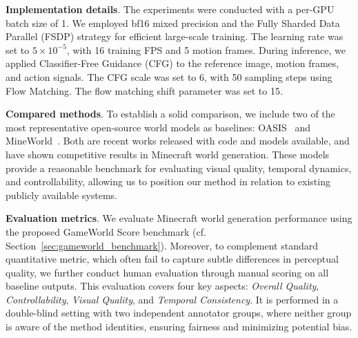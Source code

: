 \documentclass{article}
\begin{document}
\textbf{Implementation details}. 
The experiments were conducted with a per-GPU batch size of 1. We employed bf16 mixed precision and the Fully Sharded Data Parallel (FSDP) strategy for efficient large-scale training. The learning rate was set to $5 \times 10^{-5}$, with 16 training FPS and 5 motion frames. During inference, we applied Classifier-Free Guidance (CFG) to the reference image, motion frames, and action signals. The CFG scale was set to 6, with 50 sampling steps using Flow Matching. The flow matching shift parameter was set to 15.



\textbf{Compared methods}. 
To establish a solid comparison, we include two of the most representative open-source world models as baselines: OASIS~\cite{oasis2024} and MineWorld~\cite{guo2025mineworld}. Both are recent works released with code and models available, and have shown competitive results in Minecraft world generation. These models provide a reasonable benchmark for evaluating visual quality, temporal dynamics, and controllability, allowing us to position our method in relation to existing publicly available systems.


\textbf{Evaluation metrics}. We evaluate Minecraft world generation performance using the proposed {GameWorld Score} benchmark (cf. Section~\ref{sec:gameworld_benchmark}). Moreover, to complement standard quantitative metric, which often fail to capture subtle differences in perceptual quality, we further conduct human evaluation through manual scoring on all baseline outputs. This evaluation covers four key aspects: \emph{Overall Quality}, \emph{Controllability}, \emph{Visual Quality}, and \emph{Temporal Consistency}. It is performed in a {double-blind setting} with {two independent annotator groups}, where neither group is aware of the method identities, ensuring fairness and minimizing potential bias.
\end{document}
